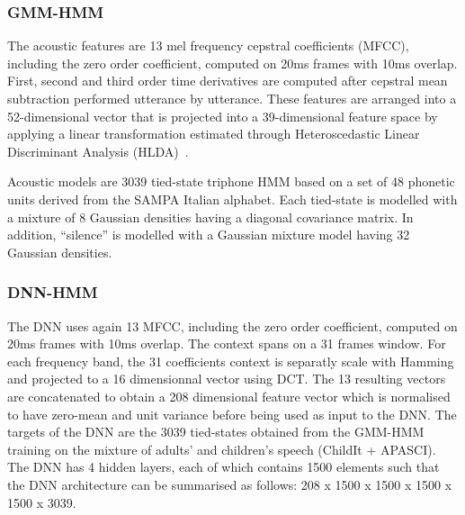 \documentclass{nle}
\begin{document}
\subsubsection{GMM-HMM}\label{sssection:base}

The  acoustic  features are  13  mel  frequency cepstral  coefficients
(MFCC), including the zero order coefficient, computed on 20ms frames
with 10ms overlap.  First, second and third order time derivatives are
computed  after  cepstral  mean  subtraction  performed  utterance  by
utterance.  These  features are arranged into  a 52-dimensional vector
that is  projected into a  39-dimensional feature space by  applying a
linear   transformation  estimated   through   Heteroscedastic  Linear
Discriminant Analysis (HLDA)~\citep*{Kumar1998283}.

Acoustic models  are 3039 tied-state  triphone HMM
based on  a set of  48 phonetic units  derived from the  SAMPA Italian
alphabet.  Each  tied-state  is modelled with  a mixture of  8 Gaussian
densities   having  a  diagonal   covariance  matrix.    In  addition,
``silence''  is  modelled  with  a  Gaussian mixture  model  having  32
Gaussian densities.

\subsubsection{DNN-HMM}\label{sssection:exp:DNN}
The DNN  uses again  13 MFCC, including  the zero  order coefficient,
computed on 20ms  frames with 10ms overlap. The context  spans on a 31
frames  window. For each frequency band, the 31 coefficients context is separatly scale with Hamming and projected to a 16 dimensionnal vector using DCT. The 13 resulting vectors are concatenated to obtain a 208 dimensional feature  vector which is normalised to have zero-mean and unit variance before being used as input to the DNN. The targets of the
DNN are the 3039 tied-states obtained from the GMM-HMM training on the
mixture of adults'  and children's speech (ChildIt +  APASCI). The DNN
has 4  hidden layers, each of  which contains 1500  elements such that
the DNN architecture can be summarised as follows: 208 x 1500 x 1500 x
1500 x 1500 x 3039.
\end{document}
